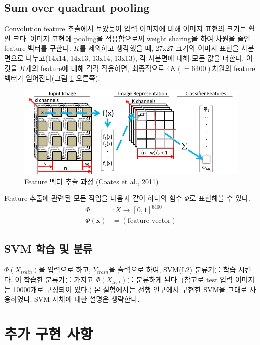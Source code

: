 \documentclass[a4paper,9pt]{article}
\begin{document}
\begin{multicols*}{2}
\subsection{Sum over quadrant pooling}
\label{sec:quadrant_pooling}

Convolution feature 추출에서 보았듯이 입력 이미지에 비해 이미지 표현의 크기는 훨씬 크다.
이미지 표현에 pooling을 적용함으로써 weight sharing을 하여 차원을 줄인 feature 벡터를 구한다.
$K$를 제외하고 생각했을 때, 27x27 크기의 이미지 표현을 사분면으로 나누고(14x14, 14x13, 13x14, 13x13), 각 사분면에 대해 모든 값을 더한다.
이것을 $K$개의 feature에 대해 각각 적용하면, 최종적으로 $4K(=6400)$차원의 feature 벡터가 얻어진다(그림 \ref{fig:feature_extraction} 오른쪽).

\begin{figure}[H]
\includegraphics[width=\linewidth]{feature_extraction}
\caption{Feature 벡터 추출 과정 (Coates et al., 2011)}
\label{fig:feature_extraction}
\end{figure}

Feature 추출에 관련된 모든 작업을 다음과 같이 하나의 함수 $\Phi$로 표현해볼 수 있다.
\begin{align*}
    \Phi &\colon X \to [0, 1]^{6400} \\
    \Phi(\mathbf{x}) &= (\text{feature vector})
\end{align*}

\subsection{SVM 학습 및 분류}

$\Phi(X_{train})$을 입력으로 하고, $Y_{train}$을 출력으로 하여, SVM(L2) 분류기를 학습 시킨다.
이 학습한 분류기를 가지고 $\Phi(X_{test})$를 분류하게 된다.
(참고로 test 입력 이미지는 10000개로 구성되어 있다.)
본 실험에서는 선행 연구에서 구현한 SVM을 그대로 사용하였다.
SVM 자체에 대한 설명은 생략한다.

\section{추가 구현 사항}


\end{multicols*}
\end{document}
